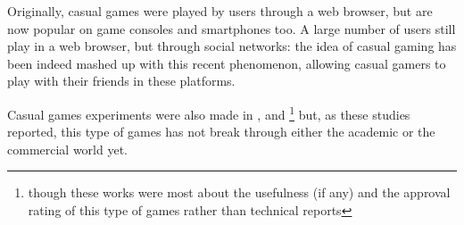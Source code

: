 Originally, casual games were played by users through a web browser, but are
now popular on game consoles and smartphones too. A large number of users still
play in a web browser, but through social networks: the idea of casual gaming
has been indeed mashed up with this recent phenomenon, allowing casual gamers to
play with their friends in these platforms.

Casual games experiments were also made in \cite{bib:ppav-casual},
\cite{bib:li-k-social-casual} and \cite{bib:mob-health-casual}\footnote{though
these works were most about the usefulness (if any) and the approval rating of
this type of games rather than technical reports} but, as these studies
reported, this type of games has not break through either the academic or the
commercial world yet.
